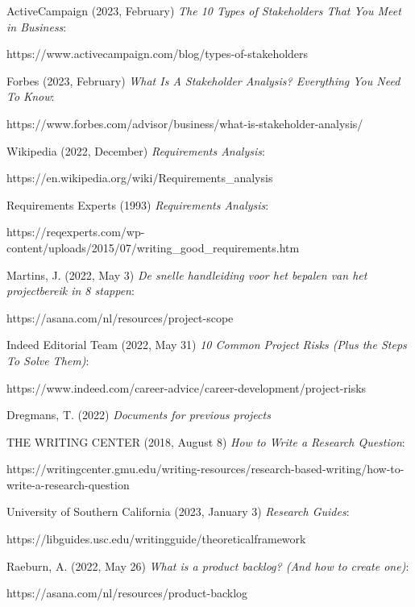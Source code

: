\documentclass[10pt]{report}
\begin{document}
\newpage

\begin{thebibliography}{1}
\thispagestyle{fancy}

ActiveCampaign (2023, February) \emph{The 10 Types of Stakeholders That You Meet in Business}:

https://www.activecampaign.com/blog/types-of-stakeholders

Forbes (2023, February) \emph{What Is A Stakeholder Analysis? Everything You Need To Know}:

https://www.forbes.com/advisor/business/what-is-stakeholder-analysis/

Wikipedia (2022, December) \emph{Requirements Analysis}:

https://en.wikipedia.org/wiki/Requirements\_analysis

Requirements Experts (1993) \emph{Requirements Analysis}:

https://reqexperts.com/wp-content/uploads/2015/07/writing\_good\_requirements.htm

Martins, J. (2022, May 3) \emph{De snelle handleiding voor het bepalen van het projectbereik in 8 stappen}:

https://asana.com/nl/resources/project-scope

Indeed Editorial Team (2022, May 31) \emph{10 Common Project Risks (Plus the Steps To Solve Them)}:

https://www.indeed.com/career-advice/career-development/project-risks

Dregmans, T. (2022) \emph{Documents for previous projects}

THE WRITING CENTER (2018, August 8) \emph{How to Write a Research Question}:

https://writingcenter.gmu.edu/writing-resources/research-based-writing/how-to-write-a-research-question

University of Southern California (2023, January 3) \emph{Research Guides}:

https://libguides.usc.edu/writingguide/theoreticalframework

 Raeburn, A. (2022, May 26) \emph{What is a product backlog? (And how to create one)}:

https://asana.com/nl/resources/product-backlog


\end{thebibliography}
\end{document}
